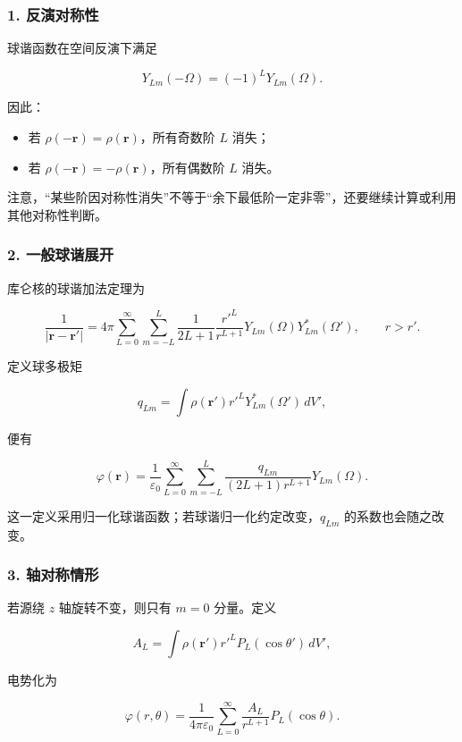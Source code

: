 \subsubsection{1. 反演对称性}\label{m2:ux53cdux6f14ux5bf9ux79f0ux6027}

球谐函数在空间反演下满足

\[
Y_{Lm}(-\Omega)=(-1)^LY_{Lm}(\Omega).
\]

因此：

\begin{itemize}
\tightlist
\item
  若 \(\rho(-\mathbf r)=\rho(\mathbf r)\)，所有奇数阶 \(L\) 消失；
\item
  若 \(\rho(-\mathbf r)=-\rho(\mathbf r)\)，所有偶数阶 \(L\) 消失。
\end{itemize}

注意，``某些阶因对称性消失''不等于``余下最低阶一定非零''，还要继续计算或利用其他对称性判断。

\subsubsection{2.
一般球谐展开}\label{m2:ux4e00ux822cux7403ux8c10ux5c55ux5f00}

库仑核的球谐加法定理为

\[
\frac1{|\mathbf r-\mathbf r'|}
=4\pi\sum_{L=0}^{\infty}\sum_{m=-L}^{L}
\frac1{2L+1}
\frac{r'^L}{r^{L+1}}
Y_{Lm}(\Omega)Y_{Lm}^*(\Omega'),
\qquad r>r'.
\]

定义球多极矩

\[
\boxed{
q_{Lm}
=\int\rho(\mathbf r')r'^LY_{Lm}^*(\Omega')\,dV'
},
\]

便有

\[
\boxed{
\varphi(\mathbf r)
=\frac1{\varepsilon_0}
\sum_{L=0}^{\infty}\sum_{m=-L}^{L}
\frac{q_{Lm}}{(2L+1)r^{L+1}}Y_{Lm}(\Omega)
}.
\]

这一定义采用归一化球谐函数；若球谐归一化约定改变，\(q_{Lm}\)
的系数也会随之改变。

\subsubsection{3. 轴对称情形}\label{m2:ux8f74ux5bf9ux79f0ux60c5ux5f62}

若源绕 \(z\) 轴旋转不变，则只有 \(m=0\) 分量。定义

\[
A_L
=\int\rho(\mathbf r')r'^LP_L(\cos\theta')\,dV',
\]

电势化为

\[
\boxed{
\varphi(r,\theta)
=\frac1{4\pi\varepsilon_0}
\sum_{L=0}^{\infty}
\frac{A_L}{r^{L+1}}P_L(\cos\theta)
}.
\]

